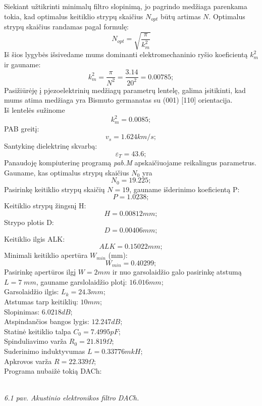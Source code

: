 \documentclass[11pt,a4paper]{article}
\begin{document}
Siekiant užtikrinti minimalų filtro slopinimą, jo pagrindo medžiaga parenkama tokia, kad optimalus keitiklio strypų skaičius $N_{opt}$ 
būtų artimas $N$. Optimalus strypų skaičius randamas pagal formulę:
\begin{equation}
N_{opt} =  \sqrt{\frac{\pi}{k_{m}^2}}
\end{equation}
Iš šios lygybės išsivedame mums dominanti elektromechaninio ryšio koeficientą $k_m^2$ ir gauname:
\[
	k_m^2 = \frac{\pi}{N^2} = \frac{3.14}{20^2} = 0.00785;
\]
Pasižiūrėję į pjezoelektrinių medžiagų parametrų lentelę, galima įsitikinti, kad mums atima medžiaga yra 
Bismuto germanatas su (001) [110] orientacija.\\
Iš lentelės sužinome 
\[
	k_m^2 = 0.0085;
\]
PAB greitį:
\[
	v_s = 1.624 km/s;
\]
Santykinę dielektrinę skvarbą:
\[
	\varepsilon _{T} = 43.6;
\]
Panaudoję kompiuterinę programą \textsl{pab.M} apskaičiuojame reikalingus parametrus.\\
Gauname, kas optimalus strypų skaičius $N_0$ yra
\[
	N_0 = 19.225;
\]
Pasirinkę keitiklio strypų skaičių $N = 19$, gauname išderinimo koeficientą P:
\[
	P = 1.0238;
\]
Keitiklio strypų žingsnį H:
\[
	H = 0.00812 mm;
\]
Strypo plotis D:
\[
	D = 0.00406 mm;
\]
Keitiklio ilgis ALK:
\[
	ALK = 0.15022 mm;
\]
Minimali keitiklio apertūra $W_{min}$ (mm):
\[
	W_{min} = 0.40299;
\]
Pasirinkę apertūros ilgį $W = 2 mm$ ir nuo garsolaidžio galo pasirinkę atstumą $L = 7\;mm$, gauname garslolaidžio plotį: $16.016 mm$;\\
Garsolaidžio ilgis: $L_k = 24.3 mm$;\\
Atstumas tarp keitiklių: $10 mm$;\\
Slopinimas: $6.0218 dB$;\\
Atspindančios bangos lygis: $12.247 dB$;\\
Statinė keitiklio talpa $C_0 = 7.4995 pF$;\\
Spinduliavimo varža $R_0 = 21.819 \Omega $;\\
Suderinimo induktyvumas $L = 0.33776 mkH$;\\
Apkrovos varža $R = 22.339 \Omega$;\\


Programa nubaižė tokią DACh:\\
\\
\textsl{6.1 pav. Akustinio elektronikos filtro DACh.}\\
\end{document}
